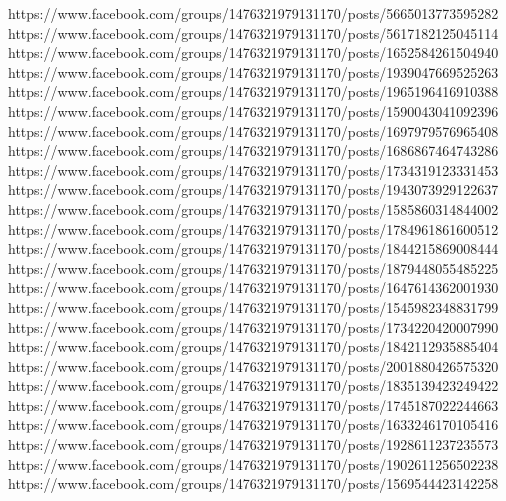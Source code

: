  
 
 
 
 


https://www.facebook.com/groups/1476321979131170/posts/5665013773595282
https://www.facebook.com/groups/1476321979131170/posts/5617182125045114
https://www.facebook.com/groups/1476321979131170/posts/1652584261504940
https://www.facebook.com/groups/1476321979131170/posts/1939047669525263
https://www.facebook.com/groups/1476321979131170/posts/1965196416910388
https://www.facebook.com/groups/1476321979131170/posts/1590043041092396
https://www.facebook.com/groups/1476321979131170/posts/1697979576965408
https://www.facebook.com/groups/1476321979131170/posts/1686867464743286
https://www.facebook.com/groups/1476321979131170/posts/1734319123331453
https://www.facebook.com/groups/1476321979131170/posts/1943073929122637
https://www.facebook.com/groups/1476321979131170/posts/1585860314844002
https://www.facebook.com/groups/1476321979131170/posts/1784961861600512
https://www.facebook.com/groups/1476321979131170/posts/1844215869008444
https://www.facebook.com/groups/1476321979131170/posts/1879448055485225
https://www.facebook.com/groups/1476321979131170/posts/1647614362001930
https://www.facebook.com/groups/1476321979131170/posts/1545982348831799
https://www.facebook.com/groups/1476321979131170/posts/1734220420007990
https://www.facebook.com/groups/1476321979131170/posts/1842112935885404
https://www.facebook.com/groups/1476321979131170/posts/2001880426575320
https://www.facebook.com/groups/1476321979131170/posts/1835139423249422
https://www.facebook.com/groups/1476321979131170/posts/1745187022244663
https://www.facebook.com/groups/1476321979131170/posts/1633246170105416
https://www.facebook.com/groups/1476321979131170/posts/1928611237235573
https://www.facebook.com/groups/1476321979131170/posts/1902611256502238
https://www.facebook.com/groups/1476321979131170/posts/1569544423142258
